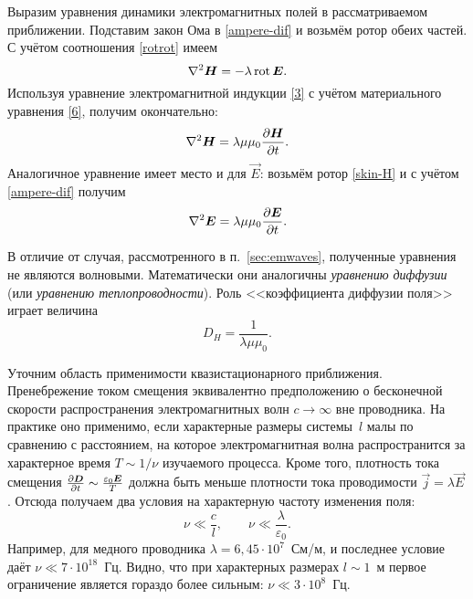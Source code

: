 Выразим уравнения динамики электромагнитных полей в рассматриваемом приближении.
Подставим закон Ома в \eqref{ampere-dif} и возьмём ротор обеих частей.
С учётом соотношения \eqref{rotrot} имеем
\begin{equation*} \eqmark{8}
\nabla^2\vec{H}= -\lambda \Rot \vec{E}.
\end{equation*}
Используя уравнение электромагнитной индукции \eqref{3} с учётом материального 
уравнения \eqref{6}, получим окончательно:
\begin{equation}\eqmark{skin-H}
\nabla^2\vec{H}= \lambda\mu\mu_0 \ddt{\vec{H}}.
\end{equation}
Аналогичное уравнение имеет место и для $\vec{E}$:
возьмём ротор \eqref{skin-H} и с учётом \eqref{ampere-dif} получим
\begin{equation}\eqmark{skin-E}
\nabla^2\vec{E}= \lambda\mu\mu_0 \ddt{\vec{E}}.
\end{equation}

В отличие от случая, рассмотренного в п.~\ref{sec:emwaves}, 
полученные уравнения не являются волновыми. Математически они аналогичны
\emph{уравнению диффузии} (или \emph{уравнению теплопроводности}). Роль 
<<коэффициента диффузии поля>> играет величина
\begin{equation}
D_{H} = \frac{1}{\lambda \mu \mu_0}.
\end{equation}

\begin{lab:note}
    Уточним область применимости квазистационарного приближения.
    Пренебрежение током смещения эквивалентно предположению о бесконечной скорости 
    распространения электромагнитных волн $c\to \infty$ вне проводника. 
    На практике оно применимо, если характерные размеры системы~$l$ малы по
    сравнению с расстоянием, на которое электромагнитная волна распространится
    за характерное время $T\sim 1/\nu$ изучаемого процесса.
    Кроме того, плотность тока смещения 
    $\frac{\partial {\boldsymbol{D}}}{\partial t} \sim \frac{\varepsilon_0 {\boldsymbol{E}}}{T}$ 
    должна быть меньше плотности тока проводимости $\vec{j}=\lambda\vec{E}$.
    Отсюда получаем два условия на характерную частоту изменения поля:
    \[
    \nu \ll \frac{c}{l},\qquad \nu \ll \frac{\lambda}{\varepsilon_0}.
    \]
    Например, для медного проводника $\lambda = 6,45\cdot 10^7$~См/м,
    и последнее условие даёт $\nu \ll 7\cdot 10^{18}$~Гц. Видно, что при характерных
    размерах $l\sim 1$~м первое ограничение является гораздо более сильным:
    $\nu \ll 3 \cdot 10^8$~Гц.
\end{lab:note}

